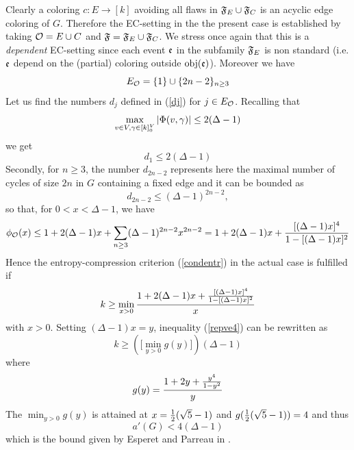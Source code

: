\documentclass[11pt]{article}
\let\D=\Delta \let\F=\Phi \let\G=\Gamma \let\L=\Lambda \let\Th=\Theta
\let\\=\noindent
\def\ee{\end{equation}}
\def\be{\begin{equation}}
\begin{document}
\\Clearly a coloring $c: E\to [k]$  avoiding all   flaws in ${\mathfrak{F}}_E\cup {\mathfrak{F}}_C$
is an acyclic edge coloring of $G$.
Therefore the EC-setting in the the present case  is established by taking ${{\mathcal O}}=E\cup C$
and ${\mathfrak{F}}={\mathfrak{F}}_E\cup{\mathfrak{F}}_C$. We stress once again that this is a {\it dependent} EC-setting since each  event ${\mathfrak{e}}$ in the subfamily  ${\mathfrak{F}}_E$ is non standard (i.e.
${\mathfrak{e}}$
depend on the (partial) coloring outside ${\rm obj}({\mathfrak{e}})$).
Moreover we have
$$
E_{{\mathcal O}}= \{1\}\cup \{2n-2\}_{n\ge 3}
$$
Let us find the numbers $d_j$ defined in (\ref{dj}) for $j\in E_{{\mathcal O}}$.
Recalling that
$$
\max_{v\in V,\g\in [k]_0^V}|\F(v,\g)|\le 2(\D-1)
$$
we get
$$
d_1\le 2(\D-1)
$$
Secondly, for $n\ge 3$,
the number $d_{2n-2}$  represents here
the maximal number of cycles  of size $2n$ in $G$ containing a fixed edge and it can be bounded as
$$
d_{2n-2} \leq (\D-1)^{2n-2},
$$
so that, for $0<x<\D-1$, we have
$$
\phi_\A(x)\le 1+2(\D-1) x+\sum_{n\ge 3}(\D-1)^{2n-2}x^{2n-2} = 1+2(\D-1) x+ {[(\D-1)x]^4\over 1- [(\D-1)x]^2}
$$
Hence the entropy-compression criterion  (\ref{condentr}) in the actual case is fulfilled if
\be\label{repve4}
k\ge \min_{x>0}{ 1+2(\D-1) x+ {[(\D-1)x]^4\over 1- [(\D-1)x]^2}\over x}
\ee
with $x>0$.
Setting $(\D-1) x=y$, inequality (\ref{repve4}) can be rewritten as
$$
{k}\ge \left(\Big[\min_{y>0}g(y)\Big]\right)(\D-1)
$$
where
$$
g(y)={1+2y+ {y^4\over 1- y^2}\over y}
$$
The $\min_{y>0}g(y)$ is attained at $x= {1\over 2}(\sqrt{5}-1)$ and $g({1\over 2}(\sqrt{5}-1))=4$
and thus
\be\label{astar2}
a'(G)< 4(\D-1)
\ee
which is the bound given by Esperet and Parreau in   \cite{EP}.
\end{document}
